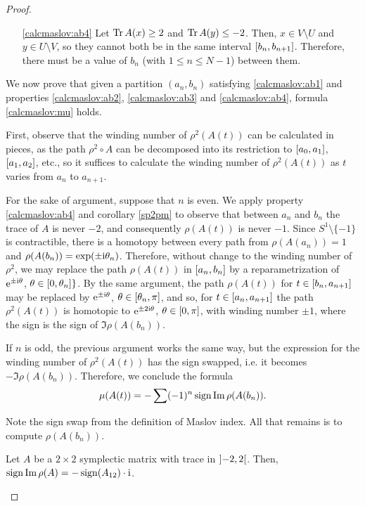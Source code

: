 \begin{proof}
\begin{itemize}
\item [\ref{calcmaslov:ab4}] Let $\operatorname{Tr} A(x) \geq 2$ and $\operatorname{Tr} A(y) \leq -2$. Then, $x \in V \setminus U$ and $y \in U \setminus V$, so they cannot both be in the same interval $\interval{b_n}{b_{n+1}}$. Therefore, there must be a value of $b_n$ (with $1 \leq n \leq N-1$) between them.
\end{itemize}

We now prove that given a partition $(a_n, b_n)$ satisfying \eqref{calcmaslov:ab1} and properties \ref{calcmaslov:ab2}, \ref{calcmaslov:ab3} and \ref{calcmaslov:ab4}, formula \eqref{calcmaslov:mu} holds.

First, observe that the winding number of $\rho^2(A(t))$ can be calculated in pieces, as the path $\rho^2 \circ A$ can be decomposed into its restriction to $\interval{a_0}{a_1}$, $\interval{a_1}{a_2}$, etc., so it suffices to calculate the winding number of $\rho^2(A(t))$ as $t$ varies from $a_n$ to $a_{n+1}$.

For the sake of argument, suppose that $n$ is even. We apply property \ref{calcmaslov:ab4} and corollary \ref{sp2pm} to observe that between $a_n$ and $b_n$ the trace of $A$ is never $-2$, and consequently $\rho(A(t))$ is never $-1$. Since $S^1 \setminus \{-1\}$ is contractible, there is a homotopy between every path from $\rho(A(a_n)) = 1$ and $\rho(A(b_n)) = \exp(\pm \mathrm{i} \theta_n)$. Therefore, without change to the winding number of $\rho^2$, we may replace the path $\rho(A(t))$ in $\interval{a_n}{b_n}$ by a reparametrization of $\mathrm{e}^{\pm \mathrm{i} \theta}$, $\theta \in \interval 0 {\theta_n}\}$. By the same argument, the path $\rho(A(t))$ for $t \in \interval{b_n}{a_{n+1}}$ may be replaced by $\mathrm{e}^{\pm \mathrm{i} \theta}$, $\theta \in \interval{\theta_n}\pi$, and so, for $t \in \interval{a_n}{a_{n+1}}$ the path $\rho^2(A(t))$ is homotopic to $\mathrm{e}^{\pm 2 \mathrm{i} \theta}$, $\theta \in \interval 0 \pi$, with winding number $\pm 1$, where the sign is the sign of $\Im \rho(A(b_n))$.

If $n$ is odd, the previous argument works the same way, but the expression for the winding number of $\rho^2(A(t))$ has the sign swapped, i.e. it becomes $- \Im \rho(A(b_n))$. Therefore, we conclude the formula
\begin{equation}
\mu(A(t)) = -\sum (-1)^n \operatorname{sign} \operatorname{Im} \rho(A(b_n)).
\end{equation}

Note the sign swap from the definition of Maslov index. All that remains is to compute $\rho(A(b_n))$.

\begin{lemma}
Let $A$ be a $2 \times 2$ symplectic matrix with trace in $\ointerval{-2}2$. Then, $\operatorname{sign} \operatorname{Im} \rho(A) = -\operatorname{sign}(A_{12}) \cdot  \mathrm{i}$.
\end{lemma}


\end{proof}
